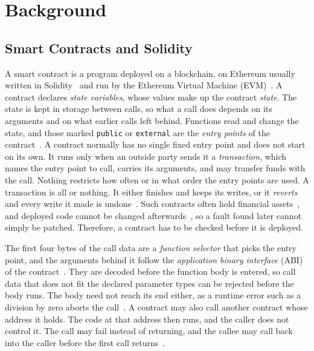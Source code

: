 \documentclass[manuscript,anonymous]{acmart}
\begin{document}
\section{Background}\label{sec:background}

\subsection{Smart Contracts and Solidity}

A smart contract is a program deployed on a blockchain, on Ethereum usually
written in Solidity~\cite{solidity_docs} and run by the Ethereum Virtual
Machine (EVM)~\cite{wood_yellowpaper_evm}. A contract declares \emph{state
variables}, whose values make up the contract \emph{state}. The state is kept
in storage between calls, so what a call does depends on its arguments and on
what earlier calls left behind. Functions read and change the state, and those
marked \texttt{public} or \texttt{external} are the \emph{entry points} of the
contract~\cite{solidityStructureOfAContract}. A contract normally has no single fixed
entry point and does not start on its own. It runs only when an outside party
sends it a \emph{transaction}, which names the entry point to call, carries its
arguments, and may transfer funds with the call. Nothing restricts how often or
in what order the entry points are used. A transaction is all or nothing. It
either finishes and keeps its writes, or it \emph{reverts} and every write it
made is undone~\cite{liu2025state}. Such contracts often hold financial
assets~\cite{werner2022sok}, and deployed code cannot be changed
afterwards~\cite{wood_yellowpaper_evm}, so a fault found later cannot simply be
patched. Therefore, a contract has to be checked before it is deployed.

The first four bytes of the call data are a \emph{function selector} that picks
the entry point, and the arguments behind it follow the \emph{application
binary interface} (ABI) of the contract~\cite{abi_spec}. They are decoded
before the function body is entered, so call data that does not fit the
declared parameter types can be rejected before the body runs. The body need
not reach its end either, as a runtime error such as a division by zero aborts
the call~\cite{solidity-panic}. A contract may also call another contract whose
address it holds. The code at that address then runs, and the caller does not
control it. The call may fail instead of returning, and the callee may call
back into the caller before the first call
returns~\cite{solidity_address_members,solidity2}.
\end{document}
